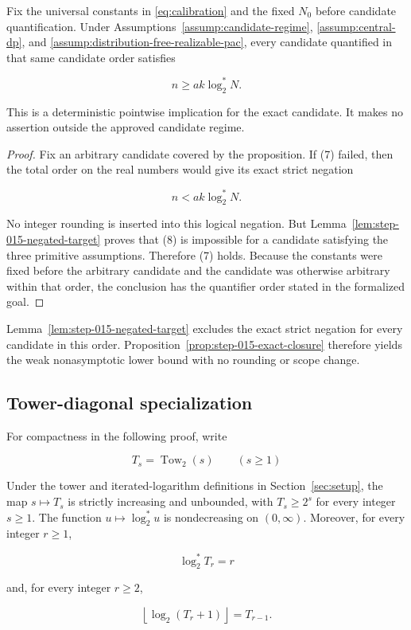 \begin{proposition}\label{prop:step-015-exact-closure}
Fix the universal constants in \eqref{eq:calibration} and the fixed
\(N_0\) before
candidate quantification. Under Assumptions~\ref{assump:candidate-regime},
\ref{assump:central-dp}, and
\ref{assump:distribution-free-realizable-pac}, every candidate quantified
in that same candidate order satisfies

\[
n\ge a k\log_2^*N.
\tag{7}
\]

This is a deterministic pointwise implication for the exact candidate. It
makes no assertion outside the approved candidate regime.
\end{proposition}

\begin{proof}
Fix an arbitrary candidate covered by the proposition. If (7) failed, then
the total order on the real numbers would give its exact strict negation

\[
n<ak\log_2^*N.
\tag{8}
\]

No integer rounding is inserted into this logical negation. But
Lemma~\ref{lem:step-015-negated-target} proves that (8) is impossible for a
candidate satisfying the three primitive assumptions. Therefore (7) holds.
Because the constants were fixed before the arbitrary candidate and the
candidate was otherwise arbitrary within that order, the conclusion has the
quantifier order stated in the formalized goal. \end{proof}
Lemma~\ref{lem:step-015-negated-target} excludes the exact strict negation
for every candidate in this order.  Proposition~\ref{prop:step-015-exact-closure}
therefore yields the weak nonasymptotic lower bound with no rounding or
scope change.

\subsection{Tower-diagonal specialization}\label{app:step-016}
For compactness in the following proof, write

\[
T_s=\operatorname{Tow}_2(s)\qquad(s\ge1)
\]

\begin{lemma}\label{lem:step-016-tower-arithmetic}
Under the tower and iterated-logarithm definitions in
Section~\ref{sec:setup}, the map
\(s\mapsto T_s\) is strictly increasing and unbounded, with
\(T_s\ge2^s\) for every integer \(s\ge1\). The function
\(u\mapsto\log_2^*u\) is nondecreasing on \((0,\infty)\). Moreover, for
every integer \(r\ge1\),

\[
\log_2^*T_r=r
\tag{1}
\]

and, for every integer \(r\ge2\),

\[
\left\lfloor\log_2(T_r+1)\right\rfloor=T_{r-1}.
\tag{2}
\]
\end{lemma}

